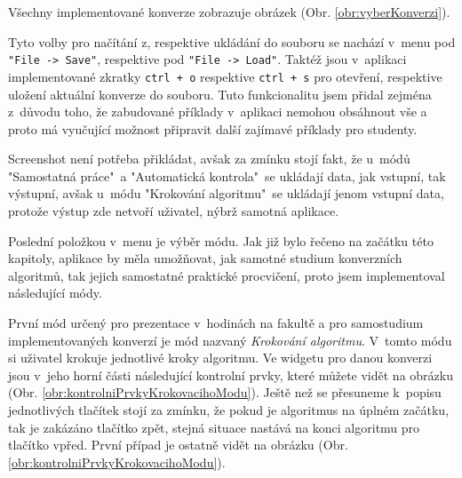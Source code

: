 Všechny implementované konverze zobrazuje obrázek (Obr. \ref{obr:vyberKonverzi}).




Tyto volby pro načítání z, respektive ukládání do souboru se nachází v~menu pod \texttt{"File -> Save"}, respektive pod \texttt{"File -> Load"}. Taktéž jsou v~aplikaci implementované zkratky \texttt{ctrl + o} respektive \texttt{ctrl + s} pro otevření, respektive uložení aktuální konverze do souboru. Tuto funkcionalitu jsem přidal zejména z~důvodu toho, že zabudované příklady v~aplikaci nemohou obsáhnout vše a proto má vyučující možnost připravit další zajímavé příklady pro studenty.  

Screenshot není potřeba přikládat, avšak za zmínku stojí fakt, že u~módů "Samostatná práce"\ a "Automatická kontrola"\ se ukládají data, jak vstupní, tak výstupní, avšak u~módu "Krokování algoritmu"\ se ukládají jenom vstupní data, protože výstup zde netvoří uživatel, nýbrž samotná aplikace.


Poslední položkou v~menu je výběr módu. Jak již bylo řečeno na začátku této kapitoly, aplikace by měla umožňovat, jak samotné studium konverzních algoritmů, tak jejich samostatné praktické procvičení, proto jsem implementoval následující módy.


První mód určený pro prezentace v~hodinách na fakultě a pro samostudium implementovaných konverzí je mód nazvaný \textit{Krokování algoritmu}. V~tomto módu si uživatel krokuje jednotlivé kroky algoritmu. Ve widgetu pro danou konverzi jsou v~jeho horní části následující kontrolní prvky, které můžete vidět na obrázku (Obr. \ref{obr:kontrolniPrvkyKrokovacihoModu}). Ještě než se přesuneme k~popisu jednotlivých tlačítek stojí za zmínku, že pokud je algoritmus na úplném začátku, tak je zakázáno tlačítko zpět, stejná situace nastává na konci algoritmu pro tlačítko vpřed. První případ je ostatně vidět na obrázku (Obr. \ref{obr:kontrolniPrvkyKrokovacihoModu}).


